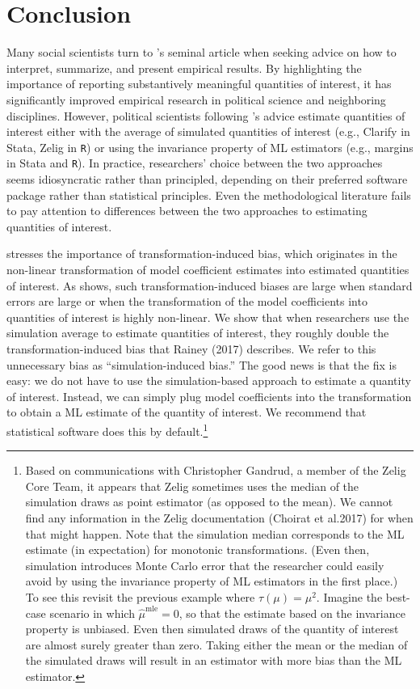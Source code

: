 \documentclass[11pt]{article}
\begin{document}
\section*{Conclusion}

Many social scientists turn to \cite{KingTomzWittenberg2000}'s seminal article when seeking advice on how to interpret, summarize, and present empirical results.
By highlighting the importance of reporting substantively meaningful quantities of interest, it has significantly improved empirical research in political science and neighboring disciplines.
However, political scientists following \cite{KingTomzWittenberg2000}'s advice estimate quantities of interest either with the average of simulated quantities of interest (e.g., Clarify in Stata, Zelig in \texttt{R}) or using the invariance property of ML estimators (e.g., margins in Stata and \texttt{R}).
In practice, researchers' choice between the two approaches seems idiosyncratic rather than principled, depending on their preferred software package rather than statistical principles.
Even the methodological literature fails to pay attention to differences between the two approaches to estimating quantities of interest.

\cite{Rainey2017} stresses the importance of transformation-induced bias, which originates in the non-linear transformation of model coefficient estimates into estimated quantities of interest.
As \cite{Rainey2017} shows, such transformation-induced biases are large when standard errors are large or when the transformation of the model coefficients into quantities of interest is highly non-linear.
We show that when researchers use the simulation average to estimate quantities of interest, they roughly double the transformation-induced bias that Rainey (2017) describes.
We refer to this unnecessary bias as ``simulation-induced bias.''
The good news is that the fix is easy: we do not have to use the simulation-based approach to estimate a quantity of interest.
Instead, we can simply plug model coefficients into the transformation to obtain a ML estimate of the quantity of interest.
We recommend that statistical software does this by default.\footnote{Based on communications with Christopher Gandrud, a member of the Zelig Core Team, it appears that Zelig sometimes uses the median of the simulation draws as point estimator (as opposed to the mean). We cannot find any information in the Zelig documentation (Choirat et al.\@ 2017) for when that might happen. Note that the simulation median corresponds to the ML estimate (in expectation) for monotonic transformations. (Even then, simulation introduces Monte Carlo error that the researcher could easily avoid by using the invariance property of ML estimators in the first place.) To see this revisit the previous example where $\tau(\mu) = \mu^2.$ Imagine the best-case scenario in which $\hat{\mu}^\text{mle} = 0$, so that the estimate based on the invariance property is unbiased. Even then simulated draws of the quantity of interest are almost surely greater than zero. Taking either the mean or the median of the simulated draws will result in an estimator with more bias than the ML estimator.}
\end{document}
